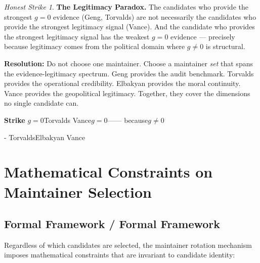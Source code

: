\documentclass[12pt,a4paper]{article}
\theoremstyle{remark}
\newtheorem{honesthit}{Honest Strike}[section]
\newenvironment{hitbox}{%
  \begin{center}
  \color{critiquered}
  \begin{minipage}{0.92\textwidth}
  \begin{honesthit}
}{%
  \end{honesthit}
  \end{minipage}
  \end{center}
}
\begin{document}
\begin{hitbox}
\textbf{The Legitimacy Paradox.}
The candidates who provide the strongest $g=0$ evidence (Geng, Torvalds)
are not necessarily the candidates who provide the strongest legitimacy
signal (Vance). And the candidate who provides the strongest legitimacy
signal has the weakest $g=0$ evidence — precisely because legitimacy comes
from the political domain where $g \neq 0$ is structural.

\textbf{Resolution:} Do not choose one maintainer. Choose a maintainer
\textit{set} that spans the evidence-legitimacy spectrum. Geng provides the
audit benchmark. Torvalds provides the operational credibility. Elbakyan
provides the moral continuity. Vance provides the geopolitical legitimacy.
Together, they cover the dimensions no single candidate can.

\textbf{Strike}
$g=0$Torvalds
Vance$g=0$——
because$g \neq 0$

\textbf{}-\textit{}
TorvaldsElbakyan
Vance
\end{hitbox}

\newpage

\section{}
\section{Mathematical Constraints on Maintainer Selection}

\subsection{Formal Framework / Formal Framework}

Regardless of which candidates are selected, the maintainer rotation
mechanism imposes mathematical constraints that are invariant to candidate
identity:
\end{document}
